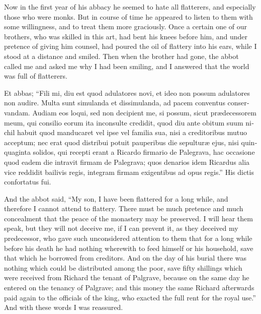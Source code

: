 \documentclass[10pt]{book}
\begin{document}
\begin{paracol}{2}
\begin{otherlanguage}{latin}
\end{otherlanguage}

\switchcolumn

Now in the first year of his abbacy he seemed to hate all flatterers, and especially those who were monks. But in course of time he appeared to listen to them with some willingness, and to treat them more graciously. Once a certain one of our brothers, who was skilled in this art, had bent his knees before him, and under pretence of giving him counsel, had poured the oil of flattery into his ears, while I stood at a distance and smiled. Then when the brother had gone, the abbot called me and asked me why I had been smiling, and I answered that the world was full of flatterers.

\switchcolumn*

\begin{otherlanguage}{latin}
Et abbas; ``Fili mi, diu est quod adulatores novi, et ideo non possum adulatores non audire. Multa sunt simulanda et dissimulanda, ad pacem conventus conservandam. Audiam eos loqui, sed non decipient me, si possum, sicut pr\ae{}decessorem meum, qui consilio eorum ita inconsulte credidit, quod diu ante obitum suum nichil habuit quod manducaret vel ipse vel familia sua, nisi a creditoribus mutuo acceptum; nec erat quod distribui potuit pauperibus die sepultur\ae{} ejus, nisi quinquaginta solidos, qui recepti erant a Ricardo firmario de Palegrava, hac occasione quod eadem die intravit firmam de Palegrava; quos denarios idem Ricardus alia vice reddidit bailivis regis, integram firmam exigentibus ad opus regis.'' His dictis confortatus fui.
\end{otherlanguage}

\switchcolumn

And the abbot said, ``My son, I have been flattered for a long while, and therefore I cannot attend to flattery. There must be much pretence and much concealment that the peace of the monastery may be preserved. I will hear them speak, but they will not deceive me, if I can prevent it, as they deceived my predecessor, who gave such unconsidered attention to them that for a long while before his death he had nothing wherewith to feed himself or his household, save that which he borrowed from creditors. And on the day of his burial there was nothing which could be distributed among the poor, save fifty shillings which were received from Richard the tenant of Palgrave, because on the same day he entered on the tenancy of Palgrave; and this money the same Richard afterwards paid again to the officials of the king, who exacted the full rent for the royal use.'' And with these words I was reassured.


\end{paracol}
\end{document}
